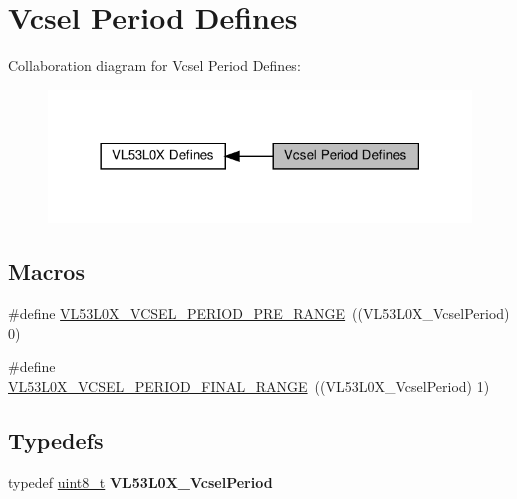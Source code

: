 \hypertarget{group__VL53L0X__define__VcselPeriod__group}{}\section{Vcsel Period Defines}
\label{group__VL53L0X__define__VcselPeriod__group}
Collaboration diagram for Vcsel Period Defines\+:\nopagebreak
\begin{figure}[H]
\begin{center}
\leavevmode
\includegraphics[width=318pt]{group__VL53L0X__define__VcselPeriod__group}
\end{center}
\end{figure}
\subsection*{Macros}
\begin{DoxyCompactItemize}
\item 
\#define \hyperlink{group__VL53L0X__define__VcselPeriod__group_ga9f8509e5364d1686c7add7e8642671a1}{V\+L53\+L0\+X\+\_\+\+V\+C\+S\+E\+L\+\_\+\+P\+E\+R\+I\+O\+D\+\_\+\+P\+R\+E\+\_\+\+R\+A\+N\+GE}~((V\+L53\+L0\+X\+\_\+\+Vcsel\+Period) 0)
\item 
\#define \hyperlink{group__VL53L0X__define__VcselPeriod__group_gaef30f6308508fde849425643076b63a3}{V\+L53\+L0\+X\+\_\+\+V\+C\+S\+E\+L\+\_\+\+P\+E\+R\+I\+O\+D\+\_\+\+F\+I\+N\+A\+L\+\_\+\+R\+A\+N\+GE}~((V\+L53\+L0\+X\+\_\+\+Vcsel\+Period) 1)
\end{DoxyCompactItemize}
\subsection*{Typedefs}
\begin{DoxyCompactItemize}
\item 
\mbox{\label{group__VL53L0X__define__VcselPeriod__group_gaacc48b699574bf03e9b71a7a2dbcf64a}} 
typedef \hyperlink{vl53l0x__types_8h_aba7bc1797add20fe3efdf37ced1182c5}{uint8\+\_\+t} {\bfseries V\+L53\+L0\+X\+\_\+\+Vcsel\+Period}
\end{DoxyCompactItemize}


